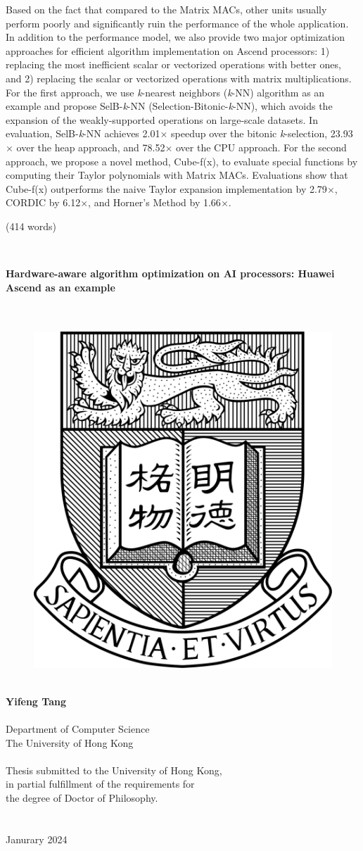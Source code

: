 \documentclass[12pt]{extbook}
\begin{document}
Based on the fact that compared to the Matrix MACs, other units usually perform poorly and significantly ruin the performance of the whole application.
In addition to the performance model, we also provide two major optimization approaches for efficient algorithm implementation on Ascend processors: 1) replacing the most inefficient scalar or vectorized operations with better ones, and 2) replacing the scalar or vectorized operations with matrix multiplications. For the first approach, we use \textit{k}-nearest neighbors (\textit{k}-NN) algorithm as an example and propose SelB-\textit{k}-NN (Selection-Bitonic-\textit{k}-NN), which avoids the expansion of the weakly-supported operations on large-scale datasets. In evaluation, SelB-\textit{k}-NN achieves 2.01$\times$ speedup over the bitonic \textit{k}-selection, 23.93$\times$ over the heap approach, and 78.52$\times$ over the CPU approach. For the second approach, we propose a novel method, Cube-f(x), to evaluate special functions by computing their Taylor polynomials with Matrix MACs. Evaluations show that Cube-f(x) outperforms the naive Taylor expansion implementation by 2.79$\times$, CORDIC by 6.12$\times$, and Horner's Method by 1.66$\times$.

(414 words)

\newpage
\thispagestyle{empty}
~


\newpage
\thispagestyle{empty}
\centering

{\Large \bf 
    Hardware-aware algorithm optimization on AI processors: Huawei Ascend as an example
}\\
~\\
~\\
\begin{figure}[htbp]
    \centering
    \includegraphics[width=5 cm]{fig/logo}
    \label{fig:logo}
\end{figure}
~\\
{\bf \large Yifeng Tang}\\
~\\
Department of Computer Science\\
The University of Hong Kong\\
~\\
Thesis submitted to the University of Hong Kong,\\
in partial fulfillment of the requirements for\\
the degree of Doctor of Philosophy.\\
~\\
~\\
Janurary 2024\\
\end{document}
